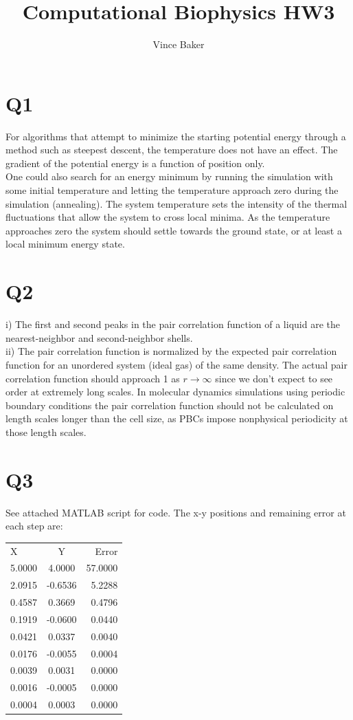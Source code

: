 \documentclass[a4paper,11pt]{article}
\title{Computational Biophysics HW3}
\author{Vince Baker}
\numberwithin{equation}{section}
\begin{document}
\maketitle

\section{Q1}
For algorithms that attempt to minimize the starting potential energy through a method such as steepest descent, the temperature does not have an effect.
The gradient of the potential energy is a function of position only.\\
One could also search for an energy minimum by running the simulation with some initial temperature and letting the temperature approach zero during the simulation (annealing).
The system temperature sets the intensity of the thermal fluctuations that allow the system to cross local minima.
As the temperature approaches zero the system should settle towards the ground state, or at least a local minimum energy state.\\

\section{Q2}
i) The first and second peaks in the pair correlation function of a liquid are the nearest-neighbor and second-neighbor shells. \\
ii) The pair correlation function is normalized by the expected pair correlation function for an unordered system (ideal gas) of the same density.
The actual pair correlation function should approach 1 as $r \rightarrow \infty$ since we don't expect to see order at extremely long scales.
In molecular dynamics simulations using periodic boundary conditions the pair correlation function should not be calculated on length scales longer than the cell size, as PBCs impose nonphysical periodicity at those length scales.

\section{Q3}
See attached MATLAB script for code. The x-y positions  and remaining error at each step are:\\
\begin{tabular}{l c | r}
    X & Y & Error \\
    5.0000 &   4.0000 &  57.0000\\
    2.0915 &  -0.6536 &   5.2288\\
    0.4587 &   0.3669 &   0.4796\\
    0.1919 &  -0.0600 &   0.0440\\
    0.0421 &   0.0337 &   0.0040\\
    0.0176 &  -0.0055 &   0.0004\\
    0.0039 &   0.0031 &   0.0000\\
    0.0016 &  -0.0005 &   0.0000\\
    0.0004 &   0.0003 &   0.0000 
\end{tabular}
\end{document}
